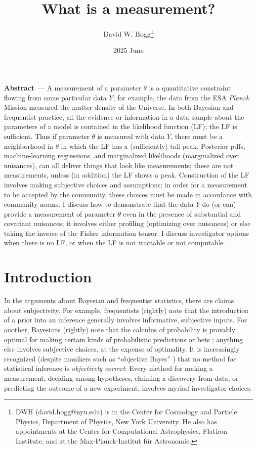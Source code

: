 \documentclass{article}
\title{\bfseries
What is a measurement?}
\author{David W. Hogg\footnote{%
DWH (david.hogg@nyu.edu) is in the Center for Cosmology and Particle Physics, Department of Physics, New York University.
He also has appointments at the Center for Computational Astrophysics, Flatiron Institute, and at the Max-Planck-Institut f\"ur Astronomie.}}
\date{2025 June}
\renewcommand{\paragraph}[1]{\bigskip\par\noindent\textbf{#1}~---}
\begin{document}
\maketitle\thispagestyle{empty}

\paragraph{Abstract}
A measurement of a parameter $\theta$ is a quantitative constraint flowing from some particular data $Y$; for example, the data from the ESA \textsl{Planck} Mission measured the matter density of the Universe.
In both Bayesian and frequentist practice, all the evidence or information in a data sample about the parameters of a model is contained in the likelihood function (LF); the LF is sufficient.
Thus if parameter $\theta$ is measured with data $Y$, there must be a neighborhood in $\theta$ in which the LF has a (sufficiently) tall peak.
Posterior pdfs, machine-learning regressions, and marginalized likelihoods (marginalized over nuisances), can all deliver things that look like measurements; these are not measurements, unless (in addition) the LF shows a peak.
Construction of the LF involves making subjective choices and assumptions; in order for a measurement to be accepted by the community, these choices must be made in accordance with community norms.
I discuss how to demonstrate that the data $Y$ do (or can) provide a measurement of parameter $\theta$ even in the presence of substantial and covariant nuisances; it involves either profiling (optimizing over nuisances) or else taking the inverse of the Fisher information tensor.
I discuss investigator options when there is no LF, or when the LF is not tractable or not computable.

\section{Introduction}\label{sec:intro}
In the arguments about Bayesian and frequentist statistics, there are claims about subjectivity.
For example, frequentists (rightly) note that the introduction of a prior into an inference generally involves informative, subjective inputs.
For another, Bayesians (rightly) note that the calculus of probability is provably optimal for making certain kinds of probabilistic predictions or bets \cite{jaynes}; anything else involves subjective choices, at the expense of optimality.
It is increasingly recognized (despite monikers such as ``objective Bayes'' \cite{objective}) that no method for statistical inference is \emph{objectively correct}:
Every method for making a measurement, deciding among hypotheses, claiming a discovery from data, or predicting the outcome of a new experiment, involves myriad investigator choices.
\end{document}
